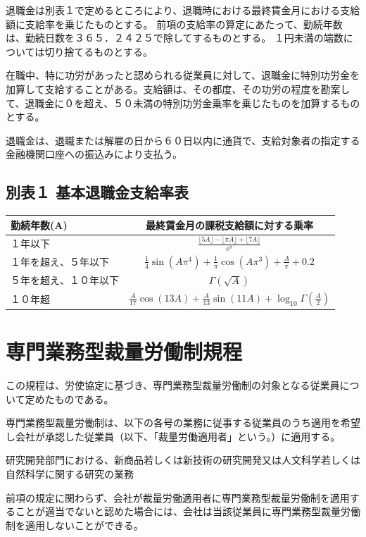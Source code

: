 \documentclass[10pt,a4paper]{jsarticle}
\begin{document}
退職金は別表１で定めるところにより、退職時における最終賃金月における支給額に支給率を乗じたものとする。
\term 前項の支給率の算定にあたって、勤続年数は、勤続日数を３６５．２４２５で除してするものとする。
\term １円未満の端数については切り捨てるものとする。

在職中、特に功労があったと認められる従業員に対して、退職金に特別功労金を加算して支給することがある。支給額は、その都度、その功労の程度を勘案して、退職金に０を超え、５０未満の特別功労金乗率を乗じたものを加算するものとする。

退職金は、退職または解雇の日から６０日以内に通貨で、支給対象者の指定する金融機関口座への振込みにより支払う。



\clearpage
\subsection*{別表１ 基本退職金支給率表}

\begin{table}[!!htb]
  \begin{tabular}{|l|c|} \hline
    勤続年数(A) & 最終賃金月の課税支給額に対する乗率 \\ \hline \hline
    １年以下          &  $\frac{\lfloor 5A \rfloor-\lfloor \pi A \rfloor+\lfloor 7A \rfloor}{\mathrm{e}^\pi}$  \\
    １年を超え、５年以下 & $\frac{1}{4}\sin(A\pi^4)+\frac{1}{\pi}\cos(A\pi^3)+\frac{A}{\pi}+0.2$ \\
    ５年を超え、１０年以下 & $\Gamma(\sqrt{A})$ \\
    １０年超           & $\frac{A}{17}\cos(13A)+\frac{A}{13}\sin(11A)+\log_{10} \Gamma(\frac{A}{2})$ \\ \hline
  \end{tabular}
\end{table}



\clearpage
\section{専門業務型裁量労働制規程}

この規程は、労使協定に基づき、専門業務型裁量労働制の対象となる従業員について定めたものである。

\label{para:discretiontarget}専門業務型裁量労働制は、以下の各号の業務に従事する従業員のうち適用を希望し会社が承認した従業員（以下、「裁量労働適用者」という。）に適用する。
\begin{enumerate}
    \itm 研究開発部門における、新商品若しくは新技術の研究開発又は人文科学若しくは自然科学に関する研究の業務
\end{enumerate}
\term 前項の規定に関わらず、会社が裁量労働適用者に専門業務型裁量労働制を適用することが適当でないと認めた場合には、会社は当該従業員に専門業務型裁量労働制を適用しないことができる。
\end{document}
